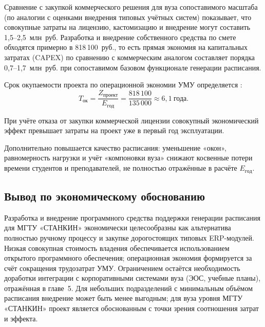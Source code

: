Сравнение с закупкой коммерческого решения для вуза сопоставимого масштаба (по аналогии с оценками внедрения типовых учётных систем) показывает, что совокупные затраты на лицензию, кастомизацию и внедрение могут составить 1{,}5--2{,}5~млн~руб. Разработка и внедрение собственного средства по смете  обходятся примерно в 818\,100~руб., то есть прямая экономия на капитальных затратах (CAPEX) по сравнению с коммерческим аналогом составляет порядка 0{,}7--1{,}7~млн~руб. при сопоставимом базовом функционале генерации расписания.

Срок окупаемости проекта по операционной экономии УМУ определяется :
\begin{equation}
	T_{\mathrm{ок}} = \frac{Z_{\mathrm{проект}}}{E_{\mathrm{год}}} = \frac{818\,100}{135\,000} \approx 6{,}1~\text{года}.
	\label{eq:payback}
\end{equation}

При учёте отказа от закупки коммерческой лицензии совокупный экономический эффект превышает затраты на проект уже в первый год эксплуатации.

Дополнительно повышается качество расписания: уменьшение «окон», равномерность нагрузки и учёт «компоновки вуза» снижают косвенные потери времени студентов и преподавателей, не полностью отражённые в расчёте $E_{\mathrm{год}}$.

\subsection{Вывод по экономическому обоснованию}
Разработка и внедрение программного средства поддержки генерации расписания для МГТУ «СТАНКИН» экономически целесообразны как альтернатива полностью ручному процессу и закупке дорогостоящих типовых ERP-модулей. Низкая совокупная стоимость владения обеспечивается использованием открытого программного обеспечения; операционная экономия формируется за счёт сокращения трудозатрат УМУ. Ограничением остаётся необходимость доработки интеграции с корпоративными системами вуза (ЭОС, учебные планы), отражённая в главе~5. Для небольших подразделений с минимальным объёмом расписания внедрение может быть менее выгодным; для вуза уровня МГТУ «СТАНКИН» проект является обоснованным с точки зрения соотношения затрат и эффекта.
